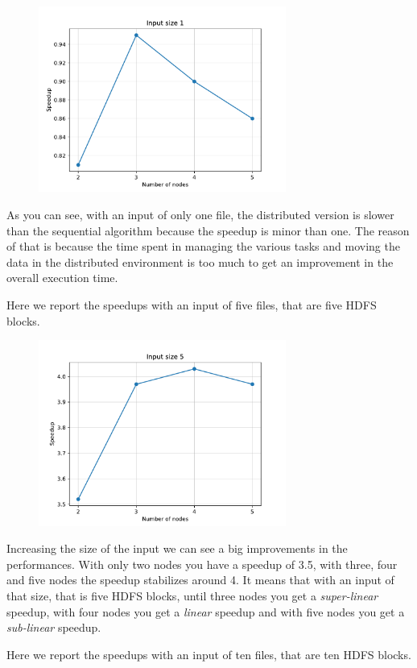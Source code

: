 \documentclass[10pt,twocolumn,letterpaper]{article}
\begin{document}
\begin{figure}[H]
\centering
\includegraphics[width=3.2in]{fig/speedup1}
\end{figure}

As you can see, with an input of only one file, the distributed version is slower than the sequential algorithm because the speedup is minor than one. The reason of that is because the time spent in managing the various tasks and moving the data in the distributed environment is too much to get an improvement in the overall execution time.

Here we report the speedups with an input of five files, that are five HDFS blocks.

\begin{figure}[H]
\centering
\includegraphics[width=3.2in]{fig/speedup5}
\end{figure}

Increasing the size of the input we can see a big improvements in the performances. With only two nodes you have a speedup of 3.5, with three, four and five nodes the speedup stabilizes around 4. It means that with an input of that size, that is five HDFS blocks, until three nodes you get a \textit{super-linear} speedup, with four nodes you get a \textit{linear} speedup and with five nodes you get a \textit{sub-linear} speedup.

Here we report the speedups with an input of ten files, that are ten HDFS blocks.
\end{document}
